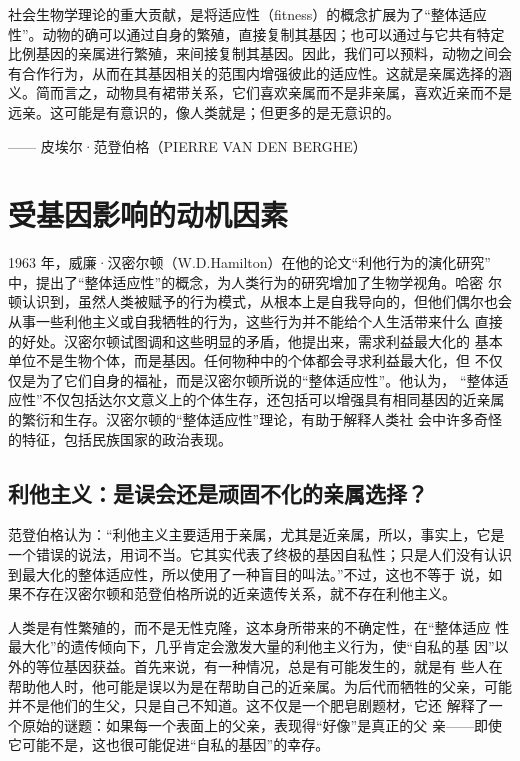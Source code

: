 \begin{tcolorbox}
社会生物学理论的重大贡献，是将适应性（fitness）的概念扩展为了“整体适应性”。动物的确可以通过自身的繁殖，直接复制其基因；也可以通过与它共有特定比例基因的亲属进行繁殖，来间接复制其基因。因此，我们可以预料，动物之间会有合作行为，从而在其基因相关的范围内增强彼此的适应性。这就是亲属选择的涵义。简而言之，动物具有裙带关系，它们喜欢亲属而不是非亲属，喜欢近亲而不是远亲。这可能是有意识的，像人类就是；但更多的是无意识的。
\begin{flushright}
—— 皮埃尔·范登伯格（PIERRE VAN DEN BERGHE） 
\end{flushright}
\end{tcolorbox}


\section{受基因影响的动机因素}

1963 年，威廉·汉密尔顿（W.D.Hamilton）在他的论文“利他行为的演化研究” 中，提出了“整体适应性”的概念，为人类行为的研究增加了生物学视角。哈密 尔顿认识到，虽然人类被赋予的行为模式，从根本上是自我导向的，但他们偶尔也会从事一些利他主义或自我牺牲的行为，这些行为并不能给个人生活带来什么 直接的好处。汉密尔顿试图调和这些明显的矛盾，他提出来，需求利益最大化的 基本单位不是生物个体，而是基因。任何物种中的个体都会寻求利益最大化，但 不仅仅是为了它们自身的福祉，而是汉密尔顿所说的“整体适应性”。他认为， “整体适应性”不仅包括达尔文意义上的个体生存，还包括可以增强具有相同基因的近亲属的繁衍和生存。汉密尔顿的“整体适应性”理论，有助于解释人类社 会中许多奇怪的特征，包括民族国家的政治表现。

\subsection{利他主义：是误会还是顽固不化的亲属选择？}

范登伯格认为：“利他主义主要适用于亲属，尤其是近亲属，所以，事实上，它是一个错误的说法，用词不当。它其实代表了终极的基因自私性；只是人们没有认识到最大化的整体适应性，所以使用了一种盲目的叫法。”不过，这也不等于 说，如果不存在汉密尔顿和范登伯格所说的近亲遗传关系，就不存在利他主义。

人类是有性繁殖的，而不是无性克隆，这本身所带来的不确定性，在“整体适应 性最大化”的遗传倾向下，几乎肯定会激发大量的利他主义行为，使“自私的基 因”以外的等位基因获益。首先来说，有一种情况，总是有可能发生的，就是有 些人在帮助他人时，他可能是误以为是在帮助自己的近亲属。为后代而牺牲的父亲，可能并不是他们的生父，只是自己不知道。这不仅是一个肥皂剧题材，它还 解释了一个原始的谜题：如果每一个表面上的父亲，表现得“好像”是真正的父 亲——即使它可能不是，这也很可能促进“自私的基因”的幸存。

